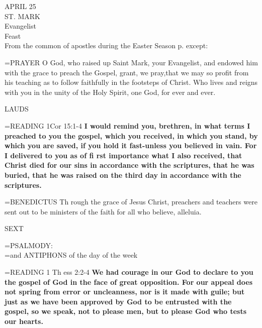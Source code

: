 \begin{center}\normalsize APRIL 25\\
\footnotesize ST. MARK\\
\footnotesize Evangelist\\
\footnotesize Feast\\
\footnotesize From the common of apostles during the Easter Season p.     except:\\
\end{center}

\hangindent=\parindent \small{PRAYER 
O God, who raised up Saint Mark, your Evangelist,
and endowed him with the grace to preach the Gospel,
grant, we pray,that we may so profit from his teaching
as to follow faithfully in the footsteps of Christ.
Who lives and reigns with you in the unity of the Holy Spirit,
one God, for ever and ever.\\}
 
\begin{flushleft}\normalsize LAUDS\\\end{flushleft}

\hangindent=\parindent \small{READING} 1Cor 15:1-4 \textbf{I would remind you, brethren, in what terms
I preached to you the gospel, which you received, in which you
stand, by which you are saved, if you hold it fast-unless you
believed in vain. For I delivered to you as of fi rst importance what
I also received, that Christ died for our sins in accordance with the
scriptures, that he was buried, that he was raised on the third day
in accordance with the scriptures.\\}
 
\hangindent=\parindent \small{BENEDICTUS  Th rough the grace of Jesus Christ, preachers and
teachers were sent out to be ministers of the faith for all who believe,
alleluia.\\}
 
\begin{flushleft}\normalsize SEXT\\\end{flushleft}

\hangindent=\parindent \small{PSALMODY:}\\
\hangindent=\parindent  and ANTIPHONS of the day of the week\vspace{0.5em}

\hangindent=\parindent \small{READING} 1 Th ess 2:2-4 \textbf{We had courage in our God to declare to you
the gospel of God in the face of great opposition. For our appeal
does not spring from error or uncleanness, nor is it made with
guile; but just as we have been approved by God to be entrusted
with the gospel, so we speak, not to please men, but to please God
who tests our hearts.}
 
